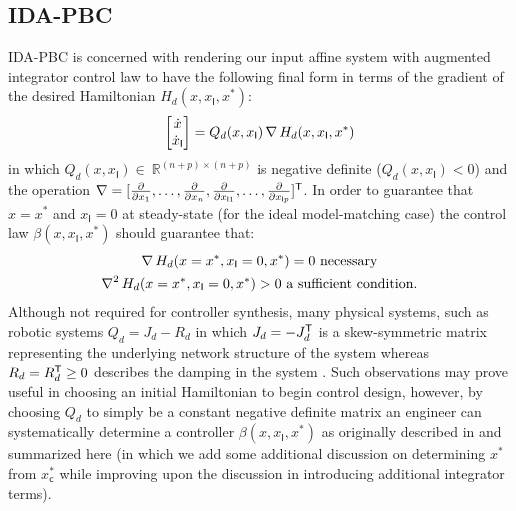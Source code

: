\subsection{IDA-PBC}
\label{S:ida_pbc}
IDA-PBC is concerned with rendering our input affine system  
with augmented integrator control law to have the following final form
in terms of the gradient of the desired Hamiltonian $H_d(x,x_{\mathsf{I}},x^*)$:
\begin{equation}
\label{E:match_eq}
\begin{bmatrix}\dot{x}\\\dot{x}_{\mathsf{I}}\end{bmatrix} = Q_d(x,x_{\mathsf{I}}) \operatorname{\nabla} H_d(x,x_{\mathsf{I}},x^*) 
\end{equation}
in which $Q_d(x,x_{\mathsf{I}}) \in\ \mathbb{R}^{(n+p) \times (n+p)}$ is negative definite
($Q_d(x,x_{\mathsf{I}}) < 0$) and the operation $\operatorname{\nabla} = [\frac{\partial}{\partial
  x_1},\dots,\frac{\partial}{\partial x_n},\frac{\partial}{\partial x_{\mathsf{I}1}},\dots,\frac{\partial}{\partial x_{\mathsf{I}p}}
  ]^{\mathsf{T}}$.  In order to guarantee that $x=x^*$ and $x_{\mathsf{I}}=0$ at steady-state (for
the ideal model-matching case) the control law $\beta(x,x_{\mathsf{I}},x^*)$ should
guarantee that: 
\begin{gather*}
\operatorname{\nabla} H_d(x=x^*,x_{\mathsf{I}}=0,x^*) = 0 \text{ necessary}\\
\operatorname{\operatorname{\nabla}^2} H_d(x=x^*,x_{\mathsf{I}}=0,x^*) > 0 \text{ a sufficient condition.}
\end{gather*}
Although not required for controller synthesis, many physical systems,
such as robotic systems $Q_d = J_d - R_d$ in which
$J_d=-J_d^{\mathsf{T}}$ is a skew-symmetric matrix representing the
underlying network structure of the system whereas $R_d =
R_d^{\mathsf{T}} \geq 0$ describes the damping in the system
\cite{ortega02:_inter_and_dampin_assig_passiv}.  Such observations may
prove useful in choosing an initial Hamiltonian to begin control
design, however, by choosing $Q_d$ to simply be a constant negative
definite matrix an engineer can systematically determine a controller
$\beta(x,x_{\mathsf{I}},x^*)$ as originally described in
\cite{johnsen07:_inter_and_dampin_assig_passiv}  and summarized here
(in which we add some additional discussion on determining $x^*$ from
$x_{\mathsf{c}}^*$ while improving upon the discussion in introducing
additional integrator terms).
